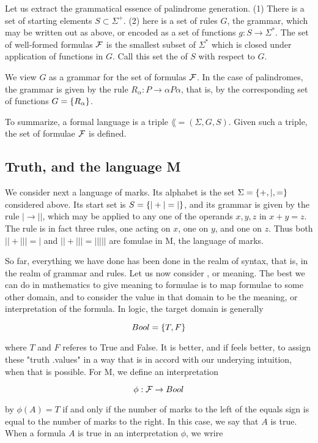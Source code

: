 Let us extract the grammatical essence of palindrome generation.  (1) There is a set of starting elements $S \subset \Sigma^+$.  (2) here is a set of rules $G$, the grammar, which may be written out as above, or encoded as a set of functions $g: S \to \Sigma^*$.  The set of well-formed formulas $\mathcal{F}$ is the smallest subset of $\Sigma^*$ which is closed under application of functions in $G$.  Call this set the  of $S$ with respect to $G$.

We view $G$ as a grammar for the set of formulas $\mathcal{F}$.  In the case of palindromes, the grammar is given by the rule $R_\alpha: P \to \alpha P \alpha$, that is, by the corresponding set of functions $G = \{  R_{\alpha } \}$.  

To summarize, a formal language is a triple $\lang = (\Sigma, G, S)$.  Given such a triple, the set of formulae $\mathcal{F}$ is defined.

\subsection{Truth, and the language M}

We consider next a language of marks.  Its alphabet is the set $\Sigma = \{ +, |, = \}$ considered above.  Its start set is $S = \{  | + | = | \}$, and its grammar is given by the rule $| \to ||$, which may be applied to any one of the operands $x, y, z$ in $x + y = z$. The rule is in fact three rules, one acting on $x$, one on $y$, and one on $z$.  Thus both $|| + ||| = |$ 
and $|| + ||| = |||||$ are fomulae in M, the language of marks.

So far, everything we have done has been done in the realm of syntax, that is, in the realm of grammar and rules.  Let us now consider , or meaning.  The best we can do in mathematics to give meaning to formulae is to map formulae to some other domain, and to consider the value in that domain to be the meaning, or interpretation of the formula.  In logic, the target domain is generally

$$
  Bool = \{ T, F \}
$$

where $T$ and $F$ referes to True and False.  It is better, and if feels better, to assign these "truth .values" in a way that is in accord with our underying intuition, when that is possible.  For M, we define an interpretation 

$$
\phi : \mathcal{F} \to Bool
$$

by $\phi(A) = T$ if and only if the number of marks to the left of the equals sign is equal to the number of marks to the right.  In this case, we say that $A$ is true.
When a formula $A$ is true in an interpretation $\phi$, we wrire 

